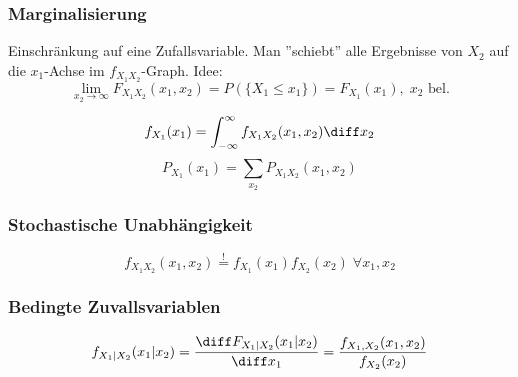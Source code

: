 \begin{sectionbox}
    \subsubsection{Marginalisierung}
    Einschränkung auf eine Zufallsvariable. Man ''schiebt'' alle Ergebnisse von $X_2$ auf die $x_1$-Achse im $f_{X_1X_2}$-Graph. Idee: \\
    \begin{equation*}
        \lim_{x_2\rightarrow\infty}F_{X_1X_2}(x_1, x_2) = P(\{X_1 \le x_1\})=F_{X_1}(x_1), \; x_2 \text{ bel.}
    \end{equation*}

    \begin{emphbox}
        \begin{equation*}
            f_{X_1}(x_1) = \int_{-\infty}^\infty f_{X_1X_2}(x_1,x_2)\diff x_2
        \end{equation*}
        \begin{equation*}
            P_{X_1}(x_1) = \sum_{x_2}P_{X_1X_2}(x_1,x_2)
        \end{equation*}
    \end{emphbox}
\end{sectionbox}

\begin{sectionbox}
    \subsubsection{Stochastische Unabhängigkeit}
    \begin{equation*}
        f_{X_1X_2}(x_1,x_2)\overset{!}{=}f_{X_1}(x_1)f_{X_2}(x_2) \; \forall x_1,x_2
    \end{equation*}
\end{sectionbox}

\begin{sectionbox}
    \subsubsection{Bedingte Zuvallsvariablen}
    \begin{emphbox}
        \begin{equation*}
            f_{X_1|X_2}(x_1|x_2) = \frac{\diff F_{X_1|X_2}(x_1|x_2)}{\diff x_1} = \frac{f_{X_1,X_2}(x_1,x_2)}{f_{X_2}(x_2)}
        \end{equation*}
    \end{emphbox}
\end{sectionbox}

